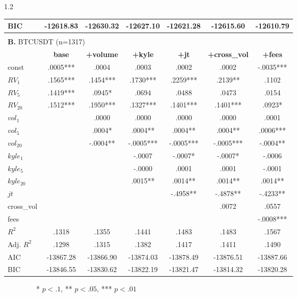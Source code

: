 \documentclass[10pt]{article}
\begin{document}
\begin{setstretch}{1.2}
\begin{table}[!htbp]
\begin{tabular}{l*{6}{c}}
BIC & \hfil -12618.83 & \hfil -12630.32 & \hfil -12627.10 & \hfil -12621.28 & \hfil -12615.60 & \hfil -12610.79 \\
\hline
\\[2pt]
\multicolumn{7}{l}{\textbf{B.} BTCUSDT (n=1317)} \\
& \textbf{base} & \textbf{+volume} & \textbf{+kyle} & \textbf{+jt} & \textbf{+cross\_vol} & \textbf{+fees} \\
\hline
const & \hfil .0005*** & \hfil .0004 & \hfil .0003 & \hfil .0002 & \hfil .0002 & \hfil -.0035*** \\
$RV_1$ & \hfil .1565*** & \hfil .1454*** & \hfil .1730*** & \hfil .2259*** & \hfil .2139** & \hfil .1102 \\
$RV_5$ & \hfil .1419*** & \hfil .0945* & \hfil .0694 & \hfil .0488 & \hfil .0473 & \hfil .0154 \\
$RV_{20}$ & \hfil .1512*** & \hfil .1950*** & \hfil .1327*** & \hfil .1401*** & \hfil .1401*** & \hfil .0923* \\
$vol_1$ & & \hfil .0000 & \hfil .0000 & \hfil .0000 & \hfil .0000 & \hfil .0001 \\
$vol_5$ & & \hfil .0004* & \hfil .0004** & \hfil .0004** & \hfil .0004** & \hfil .0006*** \\
$vol_{20}$ & & \hfil -.0004** & \hfil -.0005*** & \hfil -.0005*** & \hfil -.0005*** & \hfil -.0004** \\
$kyle_1$ & & & \hfil -.0007 & \hfil -.0007* & \hfil -.0007* & \hfil -.0006 \\
$kyle_5$ & & & \hfil -.0000 & \hfil .0001 & \hfil .0001 & \hfil -.0001 \\
$kyle_{20}$ & & & \hfil .0015** & \hfil .0014** & \hfil .0014** & \hfil .0014** \\
$jt$ & & & & \hfil -.4958** & \hfil -.4878** & \hfil -.4233** \\
cross\_vol & & & & & \hfil .0072 & \hfil .0557 \\
fees & & & & & & \hfil -.0008*** \\
\hline
$R^2$ & \hfil .1318 & \hfil .1355 & \hfil .1441 & \hfil .1483 & \hfil .1483 & \hfil .1567 \\
Adj. $R^2$ & \hfil .1298 & \hfil .1315 & \hfil .1382 & \hfil .1417 & \hfil .1411 & \hfil .1490 \\
AIC & \hfil -13867.28 & \hfil -13866.90 & \hfil -13874.03 & \hfil -13878.49 & \hfil -13876.51 & \hfil -13887.66 \\
BIC & \hfil -13846.55 & \hfil -13830.62 & \hfil -13822.19 & \hfil -13821.47 & \hfil -13814.32 & \hfil -13820.28 \\
\hline
\end{tabular}
\begin{tablenotes}
\small
\item          * $p<.1$, ** $p<.05$, *** $p<.01$
\end{tablenotes}
\end{table}


\end{setstretch}
\end{document}
